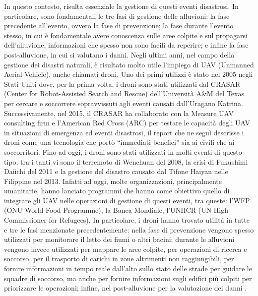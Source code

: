In questo contesto, risulta essenziale la gestione di questi eventi disastrosi. In particolare, sono fondamentali le tre fasi di gestione delle alluvioni: la fase precedente all’evento, ovvero la fase di prevenzione; la fase durante l’evento stesso, in cui è fondamentale avere conoscenza sulle aree colpite e sul propagarsi dell’alluvione, informazioni che spesso non sono facili da reperire; e infine la fase post-alluvione, in cui si valutano i danni. Negli ultimi anni, nel campo della gestione dei disastri naturali, è risultato molto utile l’impiego di UAV (Unmanned Aerial Vehicle), anche chiamati droni. Uno dei primi utilizzi è stato nel 2005 negli Stati Uniti dove, per la prima volta, i droni sono stati utilizzati dal CRASAR (Center for Robot-Assisted Search and Rescue) dell’Università A\&M del Texas per cercare e soccorrere sopravvissuti agli eventi causati dall’Uragano Katrina. Successivamente, nel 2015, il CRASAR ha collaborato con la Measure UAV consulting firm e l’American Red Cross (ARC) per testare le capacità degli UAV in situazioni di emergenza ed eventi disastrosi, il report che ne seguì descrisse i droni come una tecnologia che portò “immediati benefici” sia ai civili che ai soccorritori. Fino ad oggi, i droni sono stati utilizzati in molti eventi di questo tipo, tra i tanti vi sono il terremoto di Wenchuan del 2008, la crisi di Fukushimi Daiichi del 2011 e la gestione del disastro causato dal Tifone Haiyan nelle Filippine nel 2013.
Infatti ad oggi, molte organizzazioni, principalmente umanitarie, hanno lanciato programmi che hanno come obiettivo quello di integrare gli UAV nelle operazioni di gestione di questi eventi, tra queste: l’WFP (ONU World Food Programme), la Banca Mondiale, l’UNHCR (UN High Commissioner for Refugees). In particolare, i droni hanno trovato utilità in tutte e tre le fasi menzionate precedentemente: nella fase di prevenzione vengono spesso utilizzati per monitorare il letto dei fiumi o altri bacini; durante le alluvioni vengono invece utilizzati per mappare le aree colpite, per operazioni di ricerca e soccorso, per il trasporto di carichi in zone altrimenti non raggiungibili, per fornire informazioni in tempo reale dall’alto sullo stato delle strade per guidare le squadre di soccorso, ma anche per fornire informazioni sugli edifici più colpiti per priorizzare le operazioni; infine, nel post-alluvione per la valutazione dei danni \cite{droneappl}.
